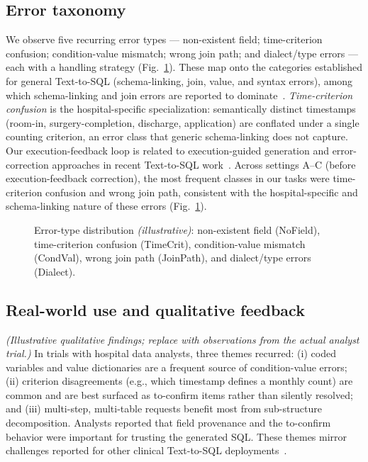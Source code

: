 \documentclass[11pt]{article}
\begin{document}
\subsection{Error taxonomy}
We observe five recurring error types --- non-existent field; time-criterion confusion;
condition-value mismatch; wrong join path; and dialect/type errors --- each with a handling strategy
(Fig.~\ref{fig:error}). These map onto the categories established for general Text-to-SQL
(schema-linking, join, value, and syntax errors), among which schema-linking and join errors are
reported to dominate~\cite{tsqlsurvey2024}. \emph{Time-criterion confusion} is the hospital-specific
specialization: semantically distinct timestamps (room-in, surgery-completion, discharge,
application) are conflated under a single counting criterion, an error class that generic
schema-linking does not capture. Our execution-feedback loop is related to execution-guided
generation and error-correction approaches in recent Text-to-SQL work~\cite{sqlthought2025}.
Across settings A--C (before execution-feedback correction), the most frequent classes in our tasks
were time-criterion confusion and wrong join path, consistent with the hospital-specific and
schema-linking nature of these errors (Fig.~\ref{fig:error}).

\begin{figure}[t]\centering
{}
\caption{Error-type distribution \textit{(illustrative)}: non-existent field (NoField),
time-criterion confusion (TimeCrit), condition-value mismatch (CondVal), wrong join path (JoinPath),
and dialect/type errors (Dialect).}\label{fig:error}
\end{figure}

\subsection{Real-world use and qualitative feedback}
\textit{(Illustrative qualitative findings; replace with observations from the actual analyst trial.)}
In trials with hospital data analysts, three themes recurred: (i) coded variables and value
dictionaries are a frequent source of condition-value errors; (ii) criterion disagreements (e.g.,
which timestamp defines a monthly count) are common and are best surfaced as to-confirm items rather
than silently resolved; and (iii) multi-step, multi-table requests benefit most from sub-structure
decomposition. Analysts reported that field provenance and the to-confirm behavior were important for
trusting the generated SQL. These themes mirror challenges reported for other clinical Text-to-SQL
deployments~\cite{metaclin2025}.
\end{document}
